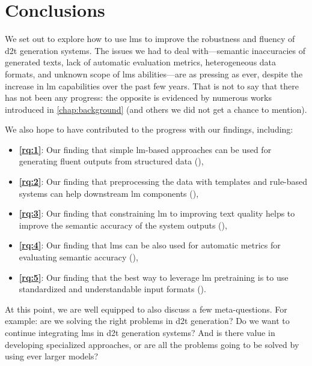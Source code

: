 
\chapter{Conclusions}
\label{chap:conclusions}

We set out to explore how to use \acp{lm} to improve the robustness and fluency of \ac{d2t} generation systems. The issues we had to deal with---semantic inaccuracies of generated texts, lack of automatic evaluation metrics, heterogeneous data formats, and unknown scope of \acp{lm} abilities---are as pressing as ever, despite the increase in \ac{lm} capabilities over the past few years. That is not to say that there has not been any progress: the opposite is evidenced by numerous works introduced in \autoref{chap:background} (and others we did not get a chance to mention).

We also hope to have contributed to the progress with our findings, including:
\begin{itemize}
    \item \textbf{\ref{rq:1}}: Our finding that simple \ac{lm}-based approaches can be used for generating fluent outputs from structured data (),
    \item \textbf{\ref{rq:2}}: Our finding that preprocessing the data with templates and rule-based systems can help downstream \ac{lm} components (),
    \item \textbf{\ref{rq:3}}: Our finding that constraining \ac{lm} to improving text quality helps to improve the semantic accuracy of the system outputs (),
    \item \textbf{\ref{rq:4}}: Our finding that \acp{lm} can be also used for automatic metrics for evaluating semantic accuracy (),
    \item \textbf{\ref{rq:5}}: Our finding that the best way to leverage \ac{lm} pretraining is to use standardized and understandable input formats ().
\end{itemize}

At this point, we are well equipped to also discuss a few meta-questions. For example: are we solving the right problems in \ac{d2t} generation? Do we want to continue integrating \aclp{lm} in \ac{d2t} generation systems? And is there value in developing specialized approaches, or are all the problems going to be solved by using ever larger models?

